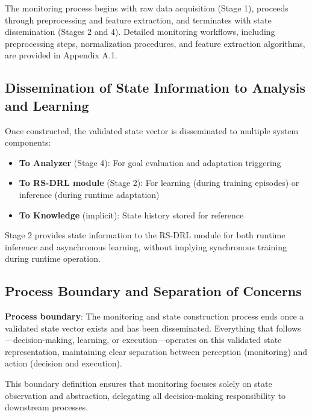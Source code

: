 \documentclass[11pt,a4paper]{article}
\begin{document}
The monitoring process begins with raw data acquisition (Stage 1), proceeds through preprocessing and feature extraction, and terminates with state dissemination (Stages 2 and 4). Detailed monitoring workflows, including preprocessing steps, normalization procedures, and feature extraction algorithms, are provided in Appendix A.1.

\subsection{Dissemination of State Information to Analysis and Learning}
\label{subsec:dissemination}

Once constructed, the validated state vector is disseminated to multiple system components:

\begin{itemize}
    \item \textbf{To Analyzer} (Stage 4): For goal evaluation and adaptation triggering
    \item \textbf{To RS-DRL module} (Stage 2): For learning (during training episodes) or inference (during runtime adaptation)
    \item \textbf{To Knowledge} (implicit): State history stored for reference
\end{itemize}

Stage 2 provides state information to the RS-DRL module for both runtime inference and asynchronous learning, without implying synchronous training during runtime operation.

\subsection{Process Boundary and Separation of Concerns}
\label{subsec:monitoring-boundary}

\textbf{Process boundary}: The monitoring and state construction process ends once a validated state vector exists and has been disseminated. Everything that follows---decision-making, learning, or execution---operates on this validated state representation, maintaining clear separation between perception (monitoring) and action (decision and execution).

This boundary definition ensures that monitoring focuses solely on state observation and abstraction, delegating all decision-making responsibility to downstream processes.

\end{document}
